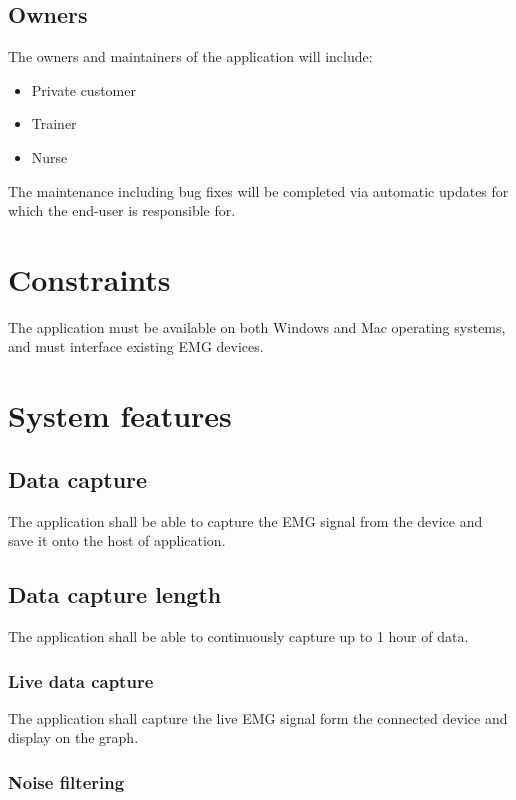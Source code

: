 \documentclass[12pt,a4paper]{article}
\begin{document}
\subsection{Owners}

The owners and maintainers of the application will include:

\begin{itemize}
	\item Private customer
	\item Trainer 
	\item Nurse
\end{itemize}

The maintenance including bug fixes will be completed via automatic updates for which the end-user is responsible for.

\section{Constraints}

The application must be available on both Windows and Mac operating systems, and must interface existing EMG devices. 

\section{System features}

\subsection{Data capture}

The application shall be able to capture the EMG signal from the device and save it onto the host of application.

\subsection{Data capture length}

The application shall be able to continuously capture up to 1 hour of data.

\subsubsection{Live data capture}

The application shall capture the live EMG signal form the connected device and display on the graph.

\subsubsection{Noise filtering}
\end{document}
